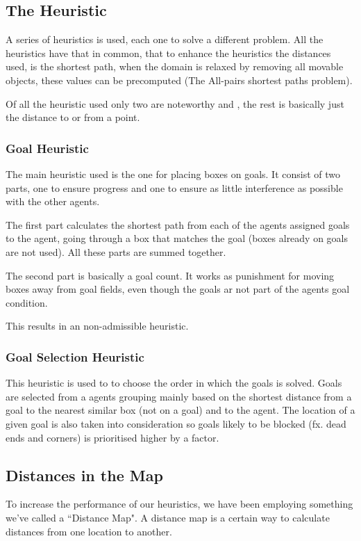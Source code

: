 \documentclass[letterpaper]{article}
\begin{document}
 
	\subsection{The Heuristic}
		A series of heuristics is used, each one to solve a different problem. All the heuristics have that in common, that to enhance the heuristics the distances used, is the shortest path, when the domain is relaxed by removing all movable objects, these values can be precomputed (The All-pairs shortest paths problem).
		
		Of all the heuristic used only two are noteworthy  and , the rest is basically just the distance to or from a point.
		\subsubsection{Goal Heuristic}\label{Goal1}
			The main heuristic used is the one for placing boxes on goals. It consist of two parts, one to ensure progress and one to ensure as little interference as possible with the other agents.
			
			The first part calculates the shortest path from each of the agents assigned goals to the agent, going through a box that matches the goal (boxes already on goals are not used). All these parts are summed together.
			
			The second part is basically a goal count. It works as punishment for moving boxes away from goal fields, even though the goals ar not part of the agents goal condition.
			
			This results in an non-admissible heuristic.
		
		\subsubsection{Goal Selection Heuristic}\label{goal2}
			This heuristic is used to to choose the order in which the goals is solved. Goals are selected from a agents grouping mainly based on the shortest distance from a goal to the nearest similar box (not on a goal) and to the agent. The location of a given goal is also taken into consideration so goals likely to be blocked (fx. dead ends and corners) is prioritised higher by a factor.

				
			
	\subsection{Distances in the Map}
		To increase the performance of our heuristics, we have been employing something we've called a ``Distance Map". A distance map is a certain way to calculate distances from one location to another.
			
\end{document}
